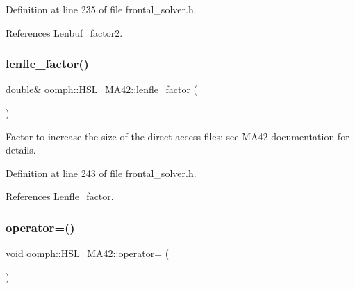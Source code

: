 Definition at line 235 of file frontal\+\_\+solver.\+h.



References Lenbuf\+\_\+factor2.

\mbox{\label{classoomph_1_1HSL__MA42_a2db42e5a60a0405753658132e8927fc0}} 
\subsubsection{\texorpdfstring{lenfle\+\_\+factor()}{lenfle\_factor()}}
{\footnotesize\ttfamily double\& oomph\+::\+H\+S\+L\+\_\+\+M\+A42\+::lenfle\+\_\+factor (\begin{DoxyParamCaption}{ }\end{DoxyParamCaption})\hspace{0.3cm}{\ttfamily [inline]}}



Factor to increase the size of the direct access files; see M\+A42 documentation for details. 



Definition at line 243 of file frontal\+\_\+solver.\+h.



References Lenfle\+\_\+factor.

\mbox{\label{classoomph_1_1HSL__MA42_ae19f381a2ead0d449d0bc1ce9dc13e39}} 
\subsubsection{\texorpdfstring{operator=()}{operator=()}}
{\footnotesize\ttfamily void oomph\+::\+H\+S\+L\+\_\+\+M\+A42\+::operator= (\begin{DoxyParamCaption}\item[{const \hyperlink{classoomph_1_1HSL__MA42}{H\+S\+L\+\_\+\+M\+A42} \&}]{ }\end{DoxyParamCaption})\hspace{0.3cm}{\ttfamily [inline]}}



